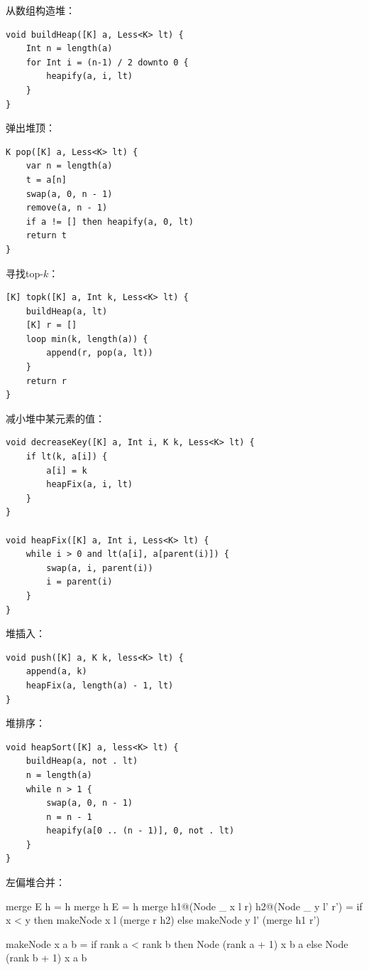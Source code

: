\documentclass[b5paper]{ctexart}
\begin{document}
从数组构造堆：

\begin{lstlisting}[language = Bourbaki]
void buildHeap([K] a, Less<K> lt) {
    Int n = length(a)
    for Int i = (n-1) / 2 downto 0 {
        heapify(a, i, lt)
    }
}
\end{lstlisting}

弹出堆顶：

\begin{lstlisting}[language = Bourbaki]
K pop([K] a, Less<K> lt) {
    var n = length(a)
    t = a[n]
    swap(a, 0, n - 1)
    remove(a, n - 1)
    if a != [] then heapify(a, 0, lt)
    return t
}
\end{lstlisting}

寻找top-$k$：

\begin{lstlisting}[language = Bourbaki]
[K] topk([K] a, Int k, Less<K> lt) {
    buildHeap(a, lt)
    [K] r = []
    loop min(k, length(a)) {
        append(r, pop(a, lt))
    }
    return r
}
\end{lstlisting}

减小堆中某元素的值：

\begin{lstlisting}[language = Bourbaki]
void decreaseKey([K] a, Int i, K k, Less<K> lt) {
    if lt(k, a[i]) {
        a[i] = k
        heapFix(a, i, lt)
    }
}

void heapFix([K] a, Int i, Less<K> lt) {
    while i > 0 and lt(a[i], a[parent(i)]) {
        swap(a, i, parent(i))
        i = parent(i)
    }
}
\end{lstlisting}

堆插入：

\begin{lstlisting}[language = Bourbaki]
void push([K] a, K k, less<K> lt) {
    append(a, k)
    heapFix(a, length(a) - 1, lt)
}
\end{lstlisting}

堆排序：

\begin{lstlisting}[language = Bourbaki]
void heapSort([K] a, less<K> lt) {
    buildHeap(a, not . lt)
    n = length(a)
    while n > 1 {
        swap(a, 0, n - 1)
        n = n - 1
        heapify(a[0 .. (n - 1)], 0, not . lt)
    }
}
\end{lstlisting}

左偏堆合并：

\begin{Haskell}
merge E h = h
merge h E = h
merge h1@(Node _ x l r) h2@(Node _ y l' r') =
    if x < y then makeNode x l (merge r h2)
    else makeNode y l' (merge h1 r')

makeNode x a b = if rank a < rank b then Node (rank a + 1) x b a
                 else Node (rank b + 1) x a b
\end{Haskell}
\end{document}
